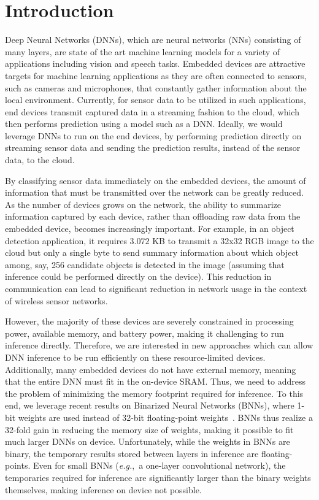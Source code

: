 \documentclass[10pt,emptycopyrightspace]{ewsn-proc}
\newcommand{\eg}{\emph{e.g.}}
\begin{document}
\section{Introduction}
Deep Neural Networks (DNNs), which are neural networks (NNs) consisting of many layers, are state of the art machine learning models for a variety of applications including vision and speech tasks. Embedded devices are attractive targets for machine learning applications as they are often connected to sensors, such as cameras and microphones, that constantly gather information about the local environment. Currently, for sensor data to be utilized in such applications, end devices transmit captured data in a streaming fashion to the cloud, which then performs prediction using a model such as a DNN. Ideally, we would leverage DNNs to run on the end devices, by performing prediction directly on streaming sensor data and sending the prediction results, instead of the sensor data, to the cloud.  

By classifying sensor data immediately on the embedded devices, the amount of information that must be transmitted over the network can be greatly reduced. As the number of devices grows on the network, the ability to summarize information captured by each device, rather than offloading raw data from the embedded device, becomes increasingly important. For example, in an object detection application, it requires $3.072$ KB to transmit a 32x32 RGB image to the cloud but only a single byte to send summary information about which object among, say, 256 candidate objects is detected in the image (assuming that inference could be performed directly on the device). This reduction in communication can lead to significant reduction in network usage in the context of wireless sensor networks.

However, the majority of these devices are severely constrained in processing power, available memory, and battery power, making it challenging to run inference directly. Therefore, we are interested in new approaches which can allow DNN inference to be run efficiently on these resource-limited devices. Additionally, many embedded devices do not have external memory, meaning that the entire DNN must fit in the on-device SRAM. Thus, we need to address the problem of minimizing the memory footprint required for inference. 
To this end, we leverage recent results on Binarized Neural Networks (BNNs), where 1-bit weights are used instead of 32-bit floating-point weights~\cite{courbariaux2015binaryconnect}. BNNs thus realize a 32-fold gain in reducing the memory size of weights, making it possible to fit much larger DNNs on device. Unfortunately, while the weights in BNNs are binary, the temporary results stored between layers in inference are floating-points. Even for small BNNs (\eg,~a one-layer convolutional network), the temporaries required for inference are significantly larger than the binary weights themselves, making inference on device not possible.
\end{document}
